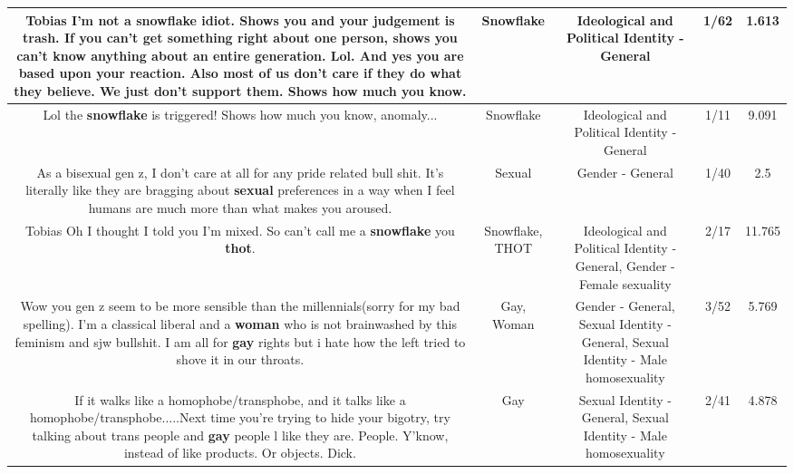 \documentclass[11pt]{article}
\newlength\mylength
\begin{document}
\begin{center}
\begin{longtable}{|C{.65\mylength}|C{.30\mylength}|C{.12\mylength}|C{.12\mylength}|C{.12\mylength}|}
  \small Tobias I'm not a \textbf{snowflake} idiot. Shows you and your judgement is trash. If you can't get something right about one person, shows you can't know anything about an entire generation. Lol. And yes you are based upon your reaction. Also most of us don't care if they do what they believe. We just don't support them. Shows how much you know.\normalsize   & Snowflake &  Ideological and Political Identity - General & 1/62 & 1.613 \\  \hline
  \small Lol the \textbf{snowflake} is triggered! Shows how much you know, anomaly...\normalsize   & Snowflake &  Ideological and Political Identity - General & 1/11 & 9.091 \\  \hline
  \small As a bisexual gen z, I don't care at all for any pride related bull shit. It's literally like they are bragging about \textbf{sexual} preferences in a way when I feel humans are much more than what makes you aroused.\normalsize   & Sexual & Gender - General & 1/40 & 2.5 \\  \hline
  \small Tobias Oh I thought I told you I'm mixed. So can't call me a \textbf{snowflake} you \textbf{thot}.\normalsize   & Snowflake, THOT &  Ideological and Political Identity - General, Gender - Female sexuality & 2/17 & 11.765 \\  \hline
  \small Wow you gen z seem to be more sensible than the millennials(sorry for my bad spelling). I'm a classical liberal and a \textbf{woman} who is not brainwashed by this feminism and sjw bullshit. I am all for \textbf{g\textbf{ay}} rights but i hate how the left tried to shove it in our throats.\normalsize   & Gay, Woman & Gender - General, Sexual Identity - General, Sexual Identity - Male homosexuality & 3/52 & 5.769 \\  \hline
  \small If it walks like a homophobe/transphobe, and it talks like a homophobe/transphobe.....Next time you're trying to hide your bigotry, try talking about trans people and \textbf{g\textbf{ay}} people l like they are. People. Y'know, instead of like products. Or objects. Dick.\normalsize   & Gay & Sexual Identity - General, Sexual Identity - Male homosexuality & 2/41 & 4.878 \\  \hline

\end{longtable}
\end{center}
\end{document}
